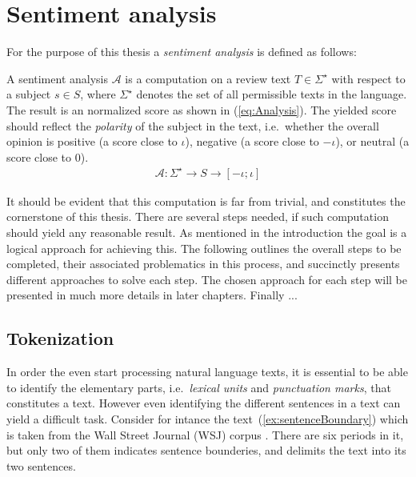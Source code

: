 
\chapter{Sentiment analysis}

For the purpose of this thesis a \emph{sentiment analysis} is defined as follows:
\begin{definition}
A sentiment analysis $\mathcal{A}$ is a computation on a review text $T \in \Sigma^\star$ with respect to a subject $s \in S$, where $\Sigma^\star$ denotes the set of all permissible texts in the language. The result is an normalized score as shown in (\ref{eq:Analysis}). The yielded score should reflect the \emph{polarity} of the subject in the text, i.e.\ whether the overall opinion is positive (a score close to $\iota$), negative (a score close to $-\iota$), or neutral (a score close to $0$).
  \begin{align}
	 \mathcal{A}: \Sigma^\star \to S \to [-\iota;\iota]
	 \label{eq:Analysis}
  \end{align}
\end{definition}

 It should be evident that this computation is far from trivial, and constitutes the cornerstone of this thesis. There are several steps needed, if such computation should yield any reasonable result. As mentioned in the introduction the goal is a logical approach for achieving this. The following outlines the overall steps to be completed, their associated problematics in this process, and succinctly presents different approaches to solve each step. The chosen approach for each step will be presented in much more details in later chapters. Finally ... 

\clearpage

\section{Tokenization}
In order the even start processing natural language texts, it is essential to be able to identify the elementary parts, i.e.\ \emph{lexical units} and \emph{punctuation marks}, that constitutes a text. However even identifying the different sentences in a text can yield a difficult task. Consider for intance the text~(\ref{ex:sentenceBoundary}) which is taken from the Wall Street Journal (WSJ) corpus \cite{wsjCorpus}. There are six periods in it, but only two of them indicates sentence bounderies, and delimits the text into its two sentences.

